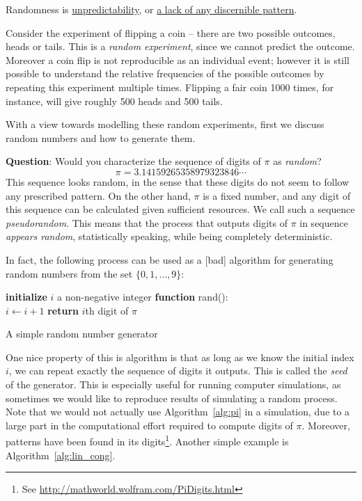 Randomness is \underline{unpredictability}, or \underline{a lack of any discernible pattern}.

Consider the experiment of flipping a coin -- there are two possible outcomes, heads or tails.
This is a \emph{random experiment}, since we cannot predict the outcome.
Moreover a coin flip is not reproducible as an individual event; however it is still possible to understand the relative frequencies of the possible outcomes by repeating this experiment multiple times.
Flipping a fair coin 1000 times, for instance, will give roughly 500 heads and 500 tails.

With a view towards modelling these random experiments, first we discuss random numbers and how to generate them.

\textbf{Question}: Would you characterize the sequence of digits of $\pi$ as \emph{random}?
$$\pi = 3.14159265358979323846\cdots$$
This sequence looks random, in the sense that these digits do not seem to follow any prescribed pattern.
On the other hand, $\pi$ is a fixed number, and any digit of this sequence can be calculated given sufficient resources.
We call such a sequence \emph{pseudorandom}.
This means that the process that outputs digits of $\pi$ in sequence \emph{appears random}, statistically speaking, while being completely deterministic.

In fact, the following process can be used as a [bad] algorithm for generating random numbers from the set $\{0, 1, \ldots, 9\}$:

\begin{algorithm}
\textbf{initialize} $i$ a non-negative integer\;
\textbf{function} rand(): \\
\qquad 	$i \leftarrow i + 1$\;
\qquad	\textbf{return} $i$th digit of $\pi$ \;
\caption{A simple random number generator}
\label{alg:pi}
\end{algorithm}

One nice property of this is algorithm is that as long as we know the initial index $i$, we can repeat exactly the sequence of digits it outputs.
This is called the \emph{seed} of the generator.
This is especially useful for running computer simulations, as sometimes we would like to reproduce results of simulating a random process.
Note that we would not actually use Algorithm~\ref{alg:pi} in a simulation, due to a large part in the computational effort required to compute digits of $\pi$.
Moreover, patterns have been found in its digits\footnote{See \url{http://mathworld.wolfram.com/PiDigits.html}}.
Another simple example is Algorithm~\ref{alg:lin_cong}.


